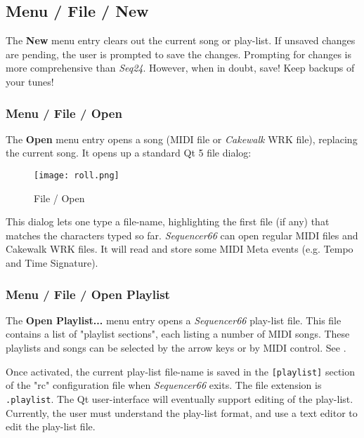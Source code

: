 
\subsection{Menu / File / New}
\label{subsec:menu_file_new}

   The \textbf{New} menu entry clears out the current song or play-list.
   If unsaved changes are pending, the user is prompted to save the changes.
   Prompting for changes is more comprehensive than \textsl{Seq24}.
   However, when in doubt, save!  Keep backups of your tunes!

\subsubsection{Menu / File / Open}
\label{subsubsec:seq66_menu_file_open}

   The \textbf{Open} menu entry opens a song (MIDI file or \textsl{Cakewalk}
   WRK file), replacing the current song.
   It opens up a standard Qt 5 file dialog:

\begin{figure}[H]
   \centering 
   \texttt{[image: roll.png]}
   \caption{File / Open}
   \label{fig:seq66_menu_file_open}
\end{figure}

   This dialog lets one type a file-name, highlighting the first file (if any)
   that matches the characters typed so far.
   \textsl{Sequencer66} can open regular MIDI files and
   Cakewalk WRK files.
   It will read and store some MIDI Meta events 
   (e.g. Tempo and Time Signature).

\subsubsection{Menu / File / Open Playlist}
\label{subsubsec:seq66_menu_file_open}

   The \textbf{Open Playlist...} menu entry opens a \textsl{Sequencer66}
   play-list file.
   This file contains a list of "playlist sections",
   each listing a number of MIDI songs.
   These playlists and songs can be
   selected by the arrow keys or by MIDI control.
   See .

   Once activated, the current play-list file-name is saved in the
   \texttt{[playlist]} section of the "rc" configuration file when
   \textsl{Sequencer66} exits.
   The file extension is \texttt{.playlist}.
   The Qt user-interface will eventually support editing of the play-list.
   Currently, the user must understand the play-list format, and use a
   text editor to edit the play-list file.

